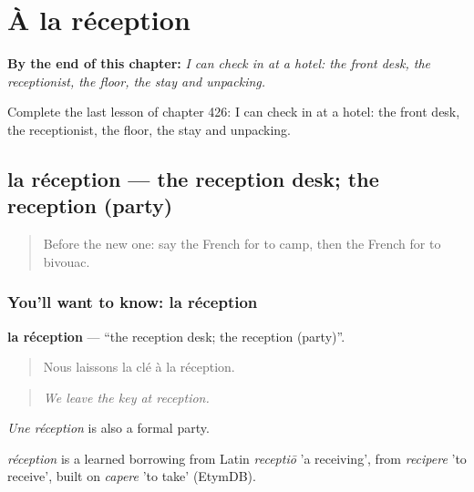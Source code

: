 
\chapter{À la réception}
\label{ch:fr-a-la-reception}

\begin{chapteropening}
\textbf{By the end of this chapter:} \emph{I can check in at a hotel: the front desk, the receptionist, the floor, the stay and unpacking.}

Complete the last lesson of chapter 426: I can check in at a hotel: the front desk, the receptionist, the floor, the stay and unpacking.
\end{chapteropening}

\section[la réception]{la réception — the reception desk; the reception (party)}

\label{lesson:FR-C426-reception}



\begin{quote}
Before the new one: say the French for to camp, then the French for to bivouac.
\end{quote}

\subsection*{You'll want to know: la réception}
\textbf{la réception} — \textquotedblleft{}the reception desk; the reception (party)\textquotedblright{}.

\begin{quote}
Nous laissons la clé à la réception.
\end{quote}

\begin{quote}
\emph{We leave the key at reception.}
\end{quote}

\emph{Une réception} is also a formal party.

\begin{cousinweb}
\emph{réception} is a learned borrowing from Latin \emph{receptiō} 'a receiving', from \emph{recipere} 'to receive', built on \emph{capere} 'to take' (EtymDB).
\end{cousinweb}

